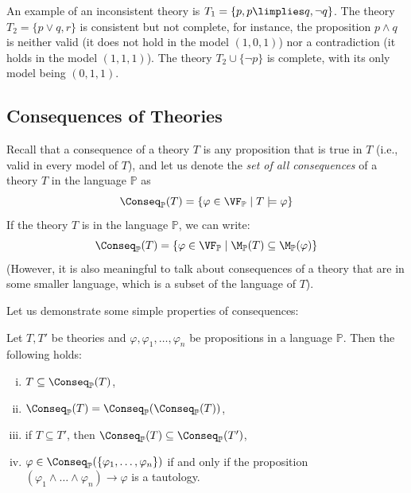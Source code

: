 \begin{example} 
    An example of an inconsistent theory is $T_1 = \{p, p \limplies q, \neg q\}$. The theory $T_2 = \{p \lor q, r\}$ is consistent but not complete, for instance, the proposition $p \land q$ is neither valid (it does not hold in the model $(1,0,1)$) nor a contradiction (it holds in the model $(1,1,1)$). The theory $T_2 \cup \{\neg p\}$ is complete, with its only model being $(0,1,1)$.
\end{example}


\subsection{Consequences of Theories}

Recall that a consequence of a theory $T$ is any proposition that is true in $T$ (i.e., valid in every model of $T$), and let us denote the \emph{set of all consequences} of a theory $T$ in the language $\mathbb P$ as
$$
\Conseq_\mathbb P(T) = \{\varphi \in \VF_\mathbb P \mid T \models \varphi\}
$$
If the theory $T$ is in the language $\mathbb P$, we can write:
$$
\Conseq_\mathbb P(T) = \{\varphi \in \VF_\mathbb P \mid \M_\mathbb P(T) \subseteq \M_\mathbb P(\varphi)\}
$$
(However, it is also meaningful to talk about consequences of a theory that are in some smaller language, which is a subset of the language of $T$).

Let us demonstrate some simple properties of consequences:
\begin{proposition}\label{proposition:properties-of-consequences}
    Let $T, T'$ be theories and $\varphi, \varphi_1, \dots, \varphi_n$ be propositions in a language $\mathbb P$. Then the following holds:
    \begin{enumerate}[(i)]       
        \item $T \subseteq \Conseq_\mathbb P(T)$,
        \item $\Conseq_\mathbb P(T) = \Conseq_\mathbb P(\Conseq_\mathbb P(T))$,
        \item if $T \subseteq T'$, then $\Conseq_\mathbb P(T) \subseteq \Conseq_\mathbb P(T')$,
        \item $\varphi \in \Conseq_\mathbb P(\{\varphi_1, \dots, \varphi_n\})$ if and only if the proposition $(\varphi_1 \land \dots \land \varphi_n) \to \varphi$ is a tautology.
    \end{enumerate}
\end{proposition}

